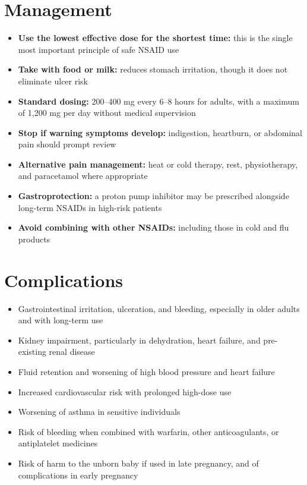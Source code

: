 \section*{Management}
\begin{itemize}
    \item \textbf{Use the lowest effective dose for the shortest time:} this is the single most important principle of safe NSAID use
    \item \textbf{Take with food or milk:} reduces stomach irritation, though it does not eliminate ulcer risk
    \item \textbf{Standard dosing:} 200--400 mg every 6--8 hours for adults, with a maximum of 1,200 mg per day without medical supervision
    \item \textbf{Stop if warning symptoms develop:} indigestion, heartburn, or abdominal pain should prompt review
    \item \textbf{Alternative pain management:} heat or cold therapy, rest, physiotherapy, and paracetamol where appropriate
    \item \textbf{Gastroprotection:} a proton pump inhibitor may be prescribed alongside long-term NSAIDs in high-risk patients
    \item \textbf{Avoid combining with other NSAIDs:} including those in cold and flu products
\end{itemize}

\section*{Complications}
\begin{itemize}
    \item Gastrointestinal irritation, ulceration, and bleeding, especially in older adults and with long-term use
    \item Kidney impairment, particularly in dehydration, heart failure, and pre-existing renal disease
    \item Fluid retention and worsening of high blood pressure and heart failure
    \item Increased cardiovascular risk with prolonged high-dose use
    \item Worsening of asthma in sensitive individuals
    \item Risk of bleeding when combined with warfarin, other anticoagulants, or antiplatelet medicines
    \item Risk of harm to the unborn baby if used in late pregnancy, and of complications in early pregnancy
\end{itemize}

